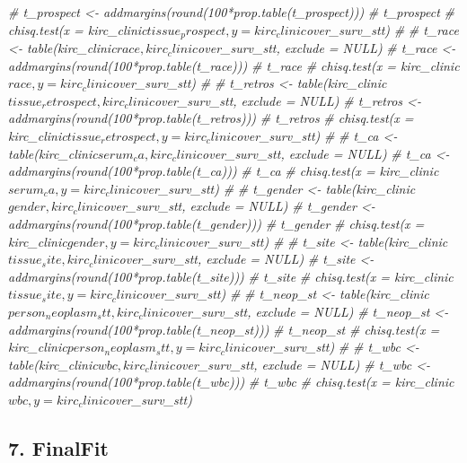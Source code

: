 \documentclass[]{article}
\newenvironment{Shaded}{\begin{snugshade}}{\end{snugshade}}
\newcommand{\CommentTok}[1]{\textcolor[rgb]{0.56,0.35,0.01}{\textit{#1}}}
\begin{document}
\begin{Shaded}
\begin{Highlighting}[]
\CommentTok{# t_prospect <- addmargins(round(100*prop.table(t_prospect)))}
\CommentTok{# t_prospect}
\CommentTok{# chisq.test(x = kirc_clinic$tissue_prospect, y = kirc_clinic$over_surv_stt)}
\CommentTok{# }
\CommentTok{# t_race <- table(kirc_clinic$race, kirc_clinic$over_surv_stt, exclude = NULL)}
\CommentTok{# t_race <- addmargins(round(100*prop.table(t_race)))}
\CommentTok{# t_race}
\CommentTok{# chisq.test(x = kirc_clinic$race, y = kirc_clinic$over_surv_stt) }
\CommentTok{# }
\CommentTok{# t_retros <- table(kirc_clinic$tissue_retrospect, kirc_clinic$over_surv_stt, exclude = NULL)}
\CommentTok{# t_retros <- addmargins(round(100*prop.table(t_retros)))}
\CommentTok{# t_retros}
\CommentTok{# chisq.test(x = kirc_clinic$tissue_retrospect, y = kirc_clinic$over_surv_stt)}
\CommentTok{# }
\CommentTok{# t_ca <- table(kirc_clinic$serum_ca, kirc_clinic$over_surv_stt, exclude = NULL)}
\CommentTok{# t_ca <- addmargins(round(100*prop.table(t_ca)))}
\CommentTok{# t_ca}
\CommentTok{# chisq.test(x = kirc_clinic$serum_ca, y = kirc_clinic$over_surv_stt) }
\CommentTok{# }
\CommentTok{# t_gender <- table(kirc_clinic$gender, kirc_clinic$over_surv_stt, exclude = NULL)}
\CommentTok{# t_gender <- addmargins(round(100*prop.table(t_gender)))}
\CommentTok{# t_gender}
\CommentTok{# chisq.test(x = kirc_clinic$gender, y = kirc_clinic$over_surv_stt) }
\CommentTok{# }
\CommentTok{# t_site <- table(kirc_clinic$tissue_site, kirc_clinic$over_surv_stt, exclude = NULL)}
\CommentTok{# t_site <- addmargins(round(100*prop.table(t_site)))}
\CommentTok{# t_site}
\CommentTok{# chisq.test(x = kirc_clinic$tissue_site, y = kirc_clinic$over_surv_stt) }
\CommentTok{# }
\CommentTok{# t_neop_st <- table(kirc_clinic$person_neoplasm_stt, kirc_clinic$over_surv_stt, exclude = NULL)}
\CommentTok{# t_neop_st <- addmargins(round(100*prop.table(t_neop_st)))}
\CommentTok{# t_neop_st}
\CommentTok{# chisq.test(x = kirc_clinic$person_neoplasm_stt, y = kirc_clinic$over_surv_stt) }
\CommentTok{# }
\CommentTok{# t_wbc <- table(kirc_clinic$wbc, kirc_clinic$over_surv_stt, exclude = NULL)}
\CommentTok{# t_wbc <- addmargins(round(100*prop.table(t_wbc)))}
\CommentTok{# t_wbc}
\CommentTok{# chisq.test(x = kirc_clinic$wbc, y = kirc_clinic$over_surv_stt) }
\end{Highlighting}
\end{Shaded}

\subsection{7. FinalFit}\label{finalfit}
\end{document}
